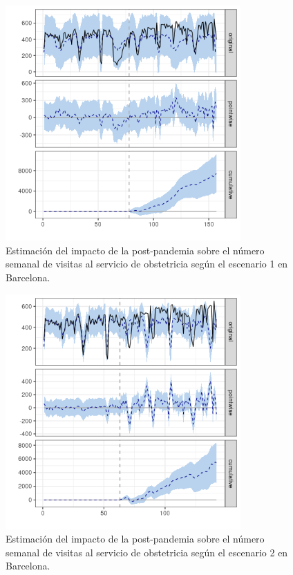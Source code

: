 \documentclass[12pt,twoside]{article} %
\begin{document}
  \begin{center}
  \begin{figure}[H]
  \includegraphics[width=9cm]{obstetrics_post_scen1_Barcelona.png}\caption{Estimación del impacto de la post-pandemia sobre el número semanal de visitas al servicio de obstetricia según el escenario 1 en Barcelona.}
  \end{figure}
  \end{center}
  
  \begin{center}
    \begin{figure}[H]
      \includegraphics[width=9cm]{obstetrics_post_scen2_Barcelona.png}\caption{Estimación del impacto de la post-pandemia sobre el número semanal de visitas al servicio de obstetricia según el escenario 2 en Barcelona.}
    \end{figure}
    \end{center}
\end{document}
